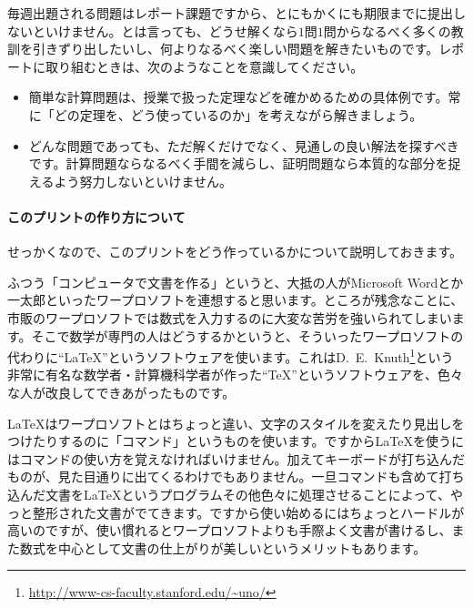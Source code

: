 毎週出題される問題はレポート課題ですから、とにもかくにも期限までに提出しないといけません。とは言っても、どうせ解くなら$1$問$1$問からなるべく多くの教訓を引きずり出したいし、何よりなるべく楽しい問題を解きたいものです。レポートに取り組むときは、次のようなことを意識してください。\vspace{-0.5zw}
\begin{itemize}
\item 簡単な計算問題は、授業で扱った定理などを確かめるための具体例です。常に「どの定理を、どう使っているのか」を考えながら解きましょう。
\item どんな問題であっても、ただ解くだけでなく、見通しの良い解法を探すべきです。計算問題ならなるべく手間を減らし、証明問題なら本質的な部分を捉えるよう努力しないといけません。
\end{itemize}\vspace{-1zw}



\paragraph{このプリントの作り方について}

せっかくなので、このプリントをどう作っているかについて説明しておきます。

ふつう「コンピュータで文書を作る」というと、大抵の人がMicrosoft Wordとか一太郎といったワープロソフトを連想すると思います。ところが残念なことに、市販のワープロソフトでは数式を入力するのに大変な苦労を強いられてしまいます。そこで数学が専門の人はどうするかというと、そういったワープロソフトの代わりに``\LaTeX''というソフトウェアを使います。これはD.~E.~Knuth\footnote{\href{http://www-cs-faculty.stanford.edu/~uno/}{\url{http://www-cs-faculty.stanford.edu/~uno/}}}という非常に有名な数学者・計算機科学者が作った``\TeX''というソフトウェアを、色々な人が改良してできあがったものです。

\LaTeX はワープロソフトとはちょっと違い、文字のスタイルを変えたり見出しをつけたりするのに「コマンド」というものを使います。ですから\LaTeX を使うにはコマンドの使い方を覚えなければいけません。加えてキーボードが打ち込んだものが、見た目通りに出てくるわけでもありません。一旦コマンドも含めて打ち込んだ文書を\LaTeX というプログラムその他色々に処理させることによって、やっと整形された文書がでてきます。ですから使い始めるにはちょっとハードルが高いのですが、使い慣れるとワープロソフトよりも手際よく文書が書けるし、また数式を中心として文書の仕上がりが美しいというメリットもあります。

